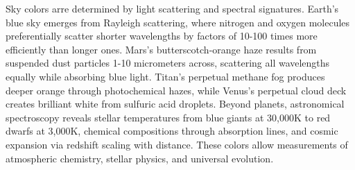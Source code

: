 Sky colors arre determined by light scattering and spectral signatures. Earth's blue sky emerges from Rayleigh scattering, where nitrogen and oxygen molecules preferentially scatter shorter wavelengths by factors of 10-100 times more efficiently than longer ones. Mars's butterscotch-orange haze results from suspended dust particles 1-10 micrometers across, scattering all wavelengths equally while absorbing blue light. Titan's perpetual methane fog produces deeper orange through photochemical hazes, while Venus's perpetual cloud deck creates brilliant white from sulfuric acid droplets. Beyond planets, astronomical spectroscopy reveals stellar temperatures from blue giants at 30,000K to red dwarfs at 3,000K, chemical compositions through absorption lines, and cosmic expansion via redshift scaling with distance. These colors allow measurements of atmospheric chemistry, stellar physics, and universal evolution.